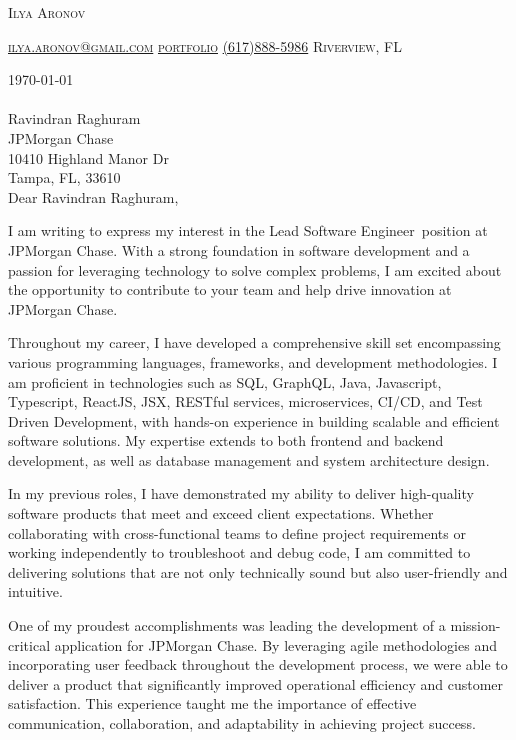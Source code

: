 \documentclass[11pt]{letter}
\makeatletter
\def\myname{Ilya Aronov}
\def\myemail{ilya.aronov@gmail.com}
\def\portfolio{https://imaronov.github.io/}
\def\myphone{(617)888-5986}
\def\mylocation{Riverview, FL}
\def\previousCompany{JPMorgan Chase}
\def\possitionApplied{Lead Software Engineer}
\def\hiringManager{Ravindran Raghuram}
\def\companyName{JPMorgan Chase}
\def\companyAddress{10410 Highland Manor Dr}
\def\companyCity{Tampa, FL, 33610}
\def\companySkills{SQL, GraphQL, Java, Javascript, Typescript, ReactJS, JSX, RESTful services, microservices, CI/CD, and Test Driven Development}
\newcommand{\addressHeading}[4]{
    {#1}\\
    {#2}\\
    {#3}\\
    {#4}\\
}
\newcommand{\greeting}{
    \vspace{-0.1in}Dear \hiringManager,
}
\makeatother
\begin{document}
\AddToShipoutPictureBG{%
\color{gr}
\AtPageUpperLeft{\rule[-1.3in]{\paperwidth}{1.3in}}
}

\begin{center}
{\fontsize{28}{0}\selectfont\scshape \myname}

\fontsize{10}{0}\selectfont\scshape \href{mailto:\myemail}{\faEnvelope\enspace \myemail}\hfill
\fontsize{10}{0}\selectfont\scshape \href{\portfolio}{\faUser\enspace portfolio}\hfill
\fontsize{10}{0}\selectfont\scshape \href{tel:\myphone}{\faPhone\enspace \myphone}\hfill
\fontsize{10}{0}\selectfont\scshape \faMapMarker\enspace \mylocation
\end{center}

\vspace{0.2in}

\today
\\ \\
\addressHeading{\hiringManager}{\companyName}{\companyAddress}{\companyCity}

\greeting

I am writing to express my interest in the \possitionApplied\, position at \companyName.
With a strong foundation in software development and a passion for leveraging technology to solve complex problems,
I am excited about the opportunity to contribute to your team and help drive innovation at \companyName.

Throughout my career, I have developed a comprehensive skill set encompassing various programming languages, frameworks, and development methodologies.
I am proficient in technologies such as \companySkills, with hands-on experience in building scalable and efficient software solutions.
My expertise extends to both frontend and backend development, as well as database management and system architecture design.

In my previous roles, I have demonstrated my ability to deliver high-quality software products that meet and exceed client expectations.
Whether collaborating with cross-functional teams to define project requirements or working independently to troubleshoot and debug code,
I am committed to delivering solutions that are not only technically sound but also user-friendly and intuitive.

One of my proudest accomplishments was leading the development of a mission-critical application for \previousCompany.
By leveraging agile methodologies and incorporating user feedback throughout the development process, we were able to deliver a product that significantly improved operational efficiency and customer satisfaction.
This experience taught me the importance of effective communication, collaboration, and adaptability in achieving project success.
\end{document}
